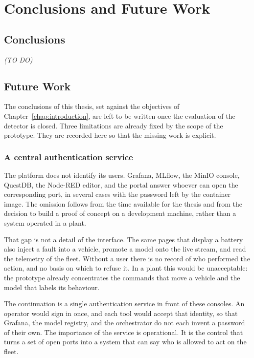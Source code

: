 \chapter{Conclusions and Future Work}
\label{chap:conclusions}

\section{Conclusions}
\label{sec:conclusions}

\textit{(TO DO)}

\section{Future Work}
\label{sec:future_work}

The conclusions of this thesis, set against the objectives of Chapter~\ref{chap:introduction}, are left to be written once the evaluation of the detector is closed. Three limitations are already fixed by the scope of the prototype. They are recorded here so that the missing work is explicit.

\subsection{A central authentication service}
\label{subsec:future_authentication}

The platform does not identify its users. Grafana, MLflow, the MinIO console, QuestDB, the Node-RED editor, and the portal answer whoever can open the corresponding port, in several cases with the password left by the container image. The omission follows from the time available for the thesis and from the decision to build a proof of concept on a development machine, rather than a system operated in a plant.

That gap is not a detail of the interface. The same pages that display a battery also inject a fault into a vehicle, promote a model onto the live stream, and read the telemetry of the fleet. Without a user there is no record of who performed the action, and no basis on which to refuse it. In a plant this would be unacceptable: the prototype already concentrates the commands that move a vehicle and the model that labels its behaviour.

The continuation is a single authentication service in front of these consoles. An operator would sign in once, and each tool would accept that identity, so that Grafana, the model registry, and the orchestrator do not each invent a password of their own. The importance of the service is operational. It is the control that turns a set of open ports into a system that can say who is allowed to act on the fleet.

